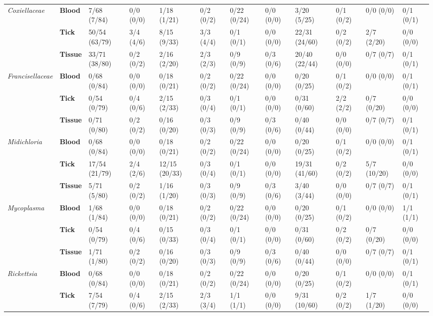 \documentclass[a4paper, nobind]{templates/ociamthesis}
\begin{document}
\begin{landscape}
\begin{table}
\begin{tabular}[t]{>{}l>{}lllllllllll}
\em{Coxiellaceae} & \textbf{Blood} & 7/68 (7/84) & 0/0 (0/0) & 1/18 (1/21) & 0/2 (0/2) & 0/22 (0/24) & 0/0 (0/0) & 3/20 (5/25) & 0/1 (0/2) & 0/0 (0/0) & 0/1 (0/1)\\
\em{} & \textbf{Tick} & 50/54 (63/79) & 3/4 (4/6) & 8/15 (9/33) & 3/3 (4/4) & 0/1 (0/1) & 0/0 (0/0) & 22/31 (24/60) & 0/2 (0/2) & 2/7 (2/20) & 0/0 (0/0)\\
\em{} & \textbf{Tissue} & 33/71 (38/80) & 0/2 (0/2) & 2/16 (2/20) & 2/3 (2/3) & 0/9 (0/9) & 0/3 (0/6) & 20/40 (22/44) & 0/0 (0/0) & 0/7 (0/7) & 0/1 (0/1)\\
\em{Francisellaceae} & \textbf{Blood} & 0/68 (0/84) & 0/0 (0/0) & 0/18 (0/21) & 0/2 (0/2) & 0/22 (0/24) & 0/0 (0/0) & 0/20 (0/25) & 0/1 (0/2) & 0/0 (0/0) & 0/1 (0/1)\\
\em{} & \textbf{Tick} & 0/54 (0/79) & 0/4 (0/6) & 2/15 (2/33) & 0/3 (0/4) & 0/1 (0/1) & 0/0 (0/0) & 0/31 (0/60) & 2/2 (2/2) & 0/7 (0/20) & 0/0 (0/0)\\
\em{} & \textbf{Tissue} & 0/71 (0/80) & 0/2 (0/2) & 0/16 (0/20) & 0/3 (0/3) & 0/9 (0/9) & 0/3 (0/6) & 0/40 (0/44) & 0/0 (0/0) & 0/7 (0/7) & 0/1 \vphantom{1} (0/1)\\
\em{Midichloria} & \textbf{Blood} & 0/68 (0/84) & 0/0 (0/0) & 0/18 (0/21) & 0/2 (0/2) & 0/22 (0/24) & 0/0 (0/0) & 0/20 (0/25) & 0/1 (0/2) & 0/0 (0/0) & 0/1 (0/1)\\
\em{} & \textbf{Tick} & 17/54 (21/79) & 2/4 (2/6) & 12/15 (20/33) & 0/3 (0/4) & 0/1 (0/1) & 0/0 (0/0) & 19/31 (41/60) & 0/2 (0/2) & 5/7 (10/20) & 0/0 (0/0)\\
\em{} & \textbf{Tissue} & 5/71 (5/80) & 0/2 (0/2) & 1/16 (1/20) & 0/3 (0/3) & 0/9 (0/9) & 0/3 (0/6) & 3/40 (3/44) & 0/0 (0/0) & 0/7 (0/7) & 0/1 (0/1)\\
\em{Mycoplasma} & \textbf{Blood} & 1/68 (1/84) & 0/0 (0/0) & 0/18 (0/21) & 0/2 (0/2) & 0/22 (0/24) & 0/0 (0/0) & 0/20 (0/25) & 0/1 (0/2) & 0/0 (0/0) & 1/1 (1/1)\\
\em{} & \textbf{Tick} & 0/54 (0/79) & 0/4 (0/6) & 0/15 (0/33) & 0/3 (0/4) & 0/1 (0/1) & 0/0 (0/0) & 0/31 (0/60) & 0/2 (0/2) & 0/7 (0/20) & 0/0 (0/0)\\
\em{} & \textbf{Tissue} & 1/71 (1/80) & 0/2 (0/2) & 0/16 (0/20) & 0/3 (0/3) & 0/9 (0/9) & 0/3 (0/6) & 0/40 (0/44) & 0/0 (0/0) & 0/7 (0/7) & 0/1 (0/1)\\
\em{Rickettsia} & \textbf{Blood} & 0/68 (0/84) & 0/0 (0/0) & 0/18 (0/21) & 0/2 (0/2) & 0/22 (0/24) & 0/0 (0/0) & 0/20 (0/25) & 0/1 (0/2) & 0/0 (0/0) & 0/1 (0/1)\\
\em{} & \textbf{Tick} & 7/54 (7/79) & 0/4 (0/6) & 2/15 (2/33) & 2/3 (3/4) & 1/1 (1/1) & 0/0 (0/0) & 9/31 (10/60) & 0/2 (0/2) & 1/7 (1/20) & 0/0 (0/0)\\

\end{tabular}
\end{table}
\end{landscape}
\end{document}
